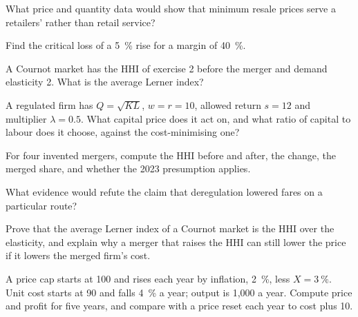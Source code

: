 \begin{exercise}[$\star$]\label{exo:b3:competition-policy:4}
What price and quantity data would show that minimum resale prices serve a
retailers'  rather than retail service?
\end{exercise}

\begin{exercise}[$\star\star$]\label{exo:b3:competition-policy:5}
Find the critical loss of a 5~\% rise for a margin of 40~\%.
\end{exercise}

\begin{exercise}[$\star\star$]\label{exo:b3:competition-policy:6}
A Cournot market has the HHI of exercise 2 before the merger and demand elasticity 2.
What is the average Lerner index?
\end{exercise}

\begin{exercise}[$\star\star$]\label{exo:b3:competition-policy:7}
A regulated firm has $Q = \sqrt{KL}$, $w = r = 10$, allowed return $s = 12$ and multiplier $\lambda = 0.5$. What capital price does it act on, and
what ratio of capital to labour does it choose, against the cost-minimising one?
\end{exercise}

\begin{exercise}[$\star\star$]\label{exo:b3:competition-policy:8}
For four invented mergers, compute the HHI before and after, the change, the merged
share, and whether the 2023 presumption applies.
\end{exercise}

\begin{exercise}[$\star\star$]\label{exo:b3:competition-policy:9}
What evidence would refute the claim that deregulation lowered fares on a
particular route?
\end{exercise}

\begin{exercise}[$\star\star\star$]\label{exo:b3:competition-policy:10}
Prove that the average Lerner index of a Cournot market is the HHI over the
elasticity, and explain why a merger that raises the HHI can still lower the price if
it lowers the merged firm's cost.
\end{exercise}

\begin{exercise}[$\star\star\star$]\label{exo:b3:competition-policy:11}
A price cap starts at 100 and rises each year by inflation, 2~\%, less $X = 3~\%$. Unit cost starts at 90 and
falls 4~\% a year; output is 1{,}000 a year. Compute price and profit for five years, and compare
with a price reset each year to cost plus 10.
\end{exercise}

